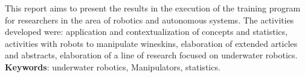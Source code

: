 \begin{thesisabastract}
  
    This report aims to present the results in the execution of the training program for researchers in the area of robotics and autonomous systems. The activities developed were: application and contextualization of concepts and statistics, activities with robots to manipulate wineskins, elaboration of extended articles and abstracts, elaboration of a line of research focused on underwater robotics.
\ \\


\textbf{Keywords}: underwater robotics, Manipulators, statistics.

\end{thesisabastract}
